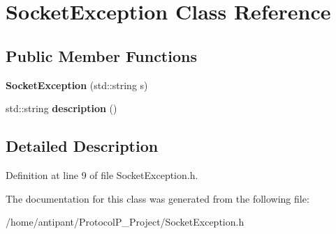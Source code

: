 \hypertarget{classSocketException}{\section{Socket\-Exception Class Reference}
\label{classSocketException}
}
\subsection*{Public Member Functions}
\begin{DoxyCompactItemize}
\item 
\hypertarget{classSocketException_a09ddb0c061c40fcb527ff89a2e803342}{{\bfseries Socket\-Exception} (std\-::string s)}\label{classSocketException_a09ddb0c061c40fcb527ff89a2e803342}

\item 
\hypertarget{classSocketException_ad7920caebddc99b6bbb7dbede569fa18}{std\-::string {\bfseries description} ()}\label{classSocketException_ad7920caebddc99b6bbb7dbede569fa18}

\end{DoxyCompactItemize}


\subsection{Detailed Description}


Definition at line 9 of file Socket\-Exception.\-h.



The documentation for this class was generated from the following file\-:\begin{DoxyCompactItemize}
\item 
/home/antipant/\-Protocol\-P\-\_\-\-Project/Socket\-Exception.\-h\end{DoxyCompactItemize}
